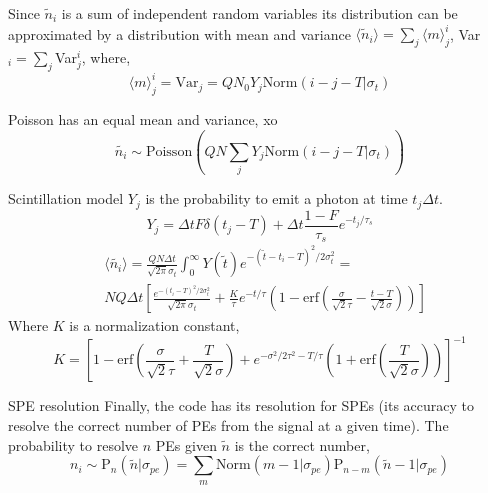 \documentclass{beamer}
\begin{document}
\begin{frame}
Since $\tilde n_i$ is a sum of independent random variables its distribution can be approximated by a distribution with mean and variance $\langle\tilde{n}_i\rangle=\sum_j\langle m\rangle_j^i$, Var$_i=\sum_j$Var$_j^i$,
where, 
\begin{equation}
\langle m\rangle_j^i=\text{Var}_j=QN_0Y_j\text{Norm}(i-j-T|\sigma_t)
\end{equation}

Poisson has an equal mean and variance, xo 
\begin{equation}
\tilde{n_i}\sim \text{Poisson}\left(QN\sum_jY_j\text{Norm}(i-j-T|\sigma_t)\right)
\end{equation}
\end{frame}

\begin{frame}{Scintillation model}
$Y_j$ is the probability to emit a photon at time $t_j\Delta t$.\\
\begin{equation}
Y_j=\Delta tF\delta(t_j-T)+\Delta t\frac{1-F}{\tau_s}e^{-t_j/\tau_s}
\end{equation}
\begin{equation}
\begin{split}
&\langle \tilde{n_i}\rangle=\frac{QN\Delta t}{\sqrt{2\pi}\sigma_t}\int_0^{\infty}Y(\tilde{t})e^{-(\tilde{t}-t_i-T)^2/2\sigma_t^2}=\\
&NQ\Delta t\left[\frac{e^{-(t_i-T)^2/2\sigma_t^2}}{\sqrt{2\pi}\sigma_t}+\frac{K}{\tau}e^{-t/\tau}\left(1-\text{erf}\left(\frac{\sigma}{\sqrt{2}\tau}-\frac{t-T}{\sqrt{2}\sigma}\right)\right)\right]
\end{split}
\end{equation}
Where $K$ is a normalization constant,
\begin{equation}
K=\left[1-\text{erf}\left(\frac{\sigma}{\sqrt{2}\tau}+\frac{T}{\sqrt{2}\sigma}\right)+e^{-\sigma^2/2\tau^2-T/\tau}\left(1+\text{erf}\left(\frac{T}{\sqrt{2}\sigma}\right)\right)\right]^{-1}
\end{equation}
\end{frame}

\begin{frame}{SPE resolution}
Finally, the code has its resolution for SPEs (its accuracy to resolve the correct number of PEs from the signal at a given time). The probability to resolve $n$ PEs given $\tilde{n}$ is the correct number,
\begin{equation}
n_i\sim \text{P}_{n}(\tilde n|\sigma_{pe})=\sum_{m}\text{Norm}(m-1|\sigma_{pe})\text{P}_{n-m}(\tilde{n}-1|\sigma_{pe})
\end{equation}
\end{frame}
\end{document}
